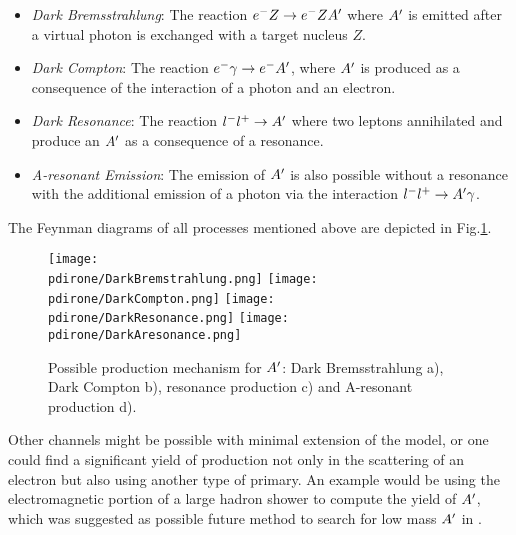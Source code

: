 \begin{itemize}
\item \textit{Dark Bremsstrahlung}: The reaction $e^- Z \to e^- Z A'$ where $A'$ is emitted after a virtual photon is exchanged with a target nucleus $Z$.
\item \textit{Dark Compton}: The reaction $e^- \gamma \to e^- A'$, where $A'$ is produced as a consequence of the interaction of a photon and an electron.
\item \textit{Dark Resonance}: The reaction $l^- l^+ \to A'$ where two leptons annihilated and produce an $A'$ as a consequence of a resonance.
\item \textit{A-resonant Emission}: The emission of $A'$ is also possible without a resonance with the additional emission of a photon via the interaction $l^- l^+ \to A' \gamma$.
\end{itemize}

The Feynman diagrams of all processes mentioned above are depicted in Fig.\ref{fig:dm-production-mechanism}.

\begin{figure}
\centering
\texttt{[image: \\pdirone/DarkBremstrahlung.png]}
\texttt{[image: \\pdirone/DarkCompton.png]}
\texttt{[image: \\pdirone/DarkResonance.png]}
\texttt{[image: \\pdirone/DarkAresonance.png]}
\caption{Possible production mechanism for $A'$: Dark Bremsstrahlung a), Dark Compton b), resonance production c) and A-resonant production d).}
\label{fig:dm-production-mechanism}
\end{figure}

Other channels might be possible with minimal extension of the model, or one could find a significant yield of production not only in the scattering of an electron but also using another type of primary. An example would be using the electromagnetic portion of a large hadron shower to compute the yield of $A'$, which was suggested as possible future method to search for low mass $A'$ in \cite{Celentano:2020vtu}.


